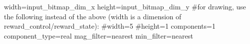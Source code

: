 width={{input_bitmap_dim_x}}
height={{input_bitmap_dim_y}}
#for drawing, use the following instead of the above (width is a dimension of reward_control/reward_state):
#width=5
#height=1
components=1
component_type=real
mag_filter=nearest
min_filter=nearest
